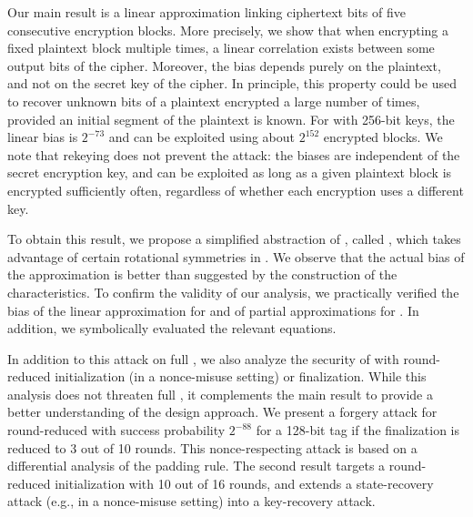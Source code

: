 Our main result is a linear approximation \cite{eurocryptMatsui93,eurocryptMatsuiY92} linking ciphertext bits of five consecutive encryption blocks.
More precisely, we show that when encrypting a fixed plaintext block multiple times, a linear correlation exists between some output bits of the cipher.
Moreover, the bias depends purely on the plaintext, and not on the secret key of the cipher.
In principle, this property could be used to recover unknown bits of a plaintext encrypted a large number of times, provided an initial segment of the plaintext is known.
For \morus[1280] with 256-bit keys, the linear bias is $2^{-73}$
and can be exploited using about $2^{152}$ encrypted blocks.
We note that rekeying does not prevent the attack: the biases are independent of the secret encryption key, and can be exploited as long as a given plaintext block is encrypted sufficiently often, regardless of whether each encryption uses a different key.

To obtain this result, we propose a simplified abstraction of \morus, called \minimorus, which takes advantage of certain rotational symmetries in \morus.
We observe that the actual bias of the approximation is better than suggested by the construction of the characteristics.
To confirm the validity of our analysis,
we practically verified the bias of the linear approximation for \minimorus and of partial approximations for \morus.
In addition, we symbolically evaluated the relevant equations.

In addition to this attack on full \morus, we also analyze the security of \morus with round-reduced initialization (in a nonce-misuse setting) or finalization.
While this analysis does not threaten full \morus, it complements the main result to provide a better understanding of the \morus design approach.
We present a forgery attack for round-reduced \morus[1280] with success probability $2^{-88}$ for a 128-bit tag if the finalization is reduced to 3 out of 10 rounds. This nonce-respecting attack is based on a differential analysis of the padding rule.
The second result targets a round-reduced initialization with 10 out of 16 rounds, and extends a state-recovery attack (e.g., in a nonce-misuse setting) into a key-recovery attack.

